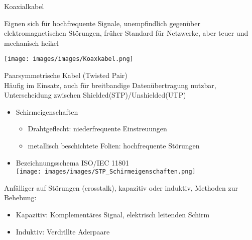     \begin{definition}{Koaxialkabel}\\
        \begin{minipage}{0.65\linewidth}
            Eignen sich für hochfrequente Signale, unempfindlich gegenüber elektromagnetischen Störungen, früher Standard für Netzwerke, aber teuer und mechanisch heikel
        \end{minipage}
        \begin{minipage}{0.3\linewidth}
            \texttt{[image: images/images/Koaxkabel.png]}
        \end{minipage}
    \end{definition}

    \begin{definition}{Paarsymmetrische Kabel (Twisted Pair)}\\
        Häufig im Einsatz, auch für breitbandige Datenübertragung nutzbar, 
        Unterscheidung zwischen Shielded(STP)/Unshielded(UTP)
        \begin{itemize}
            \item Schirmeigenschaften
            \begin{itemize}
                \item Drahtgeflecht: niederfrequente Einstreuungen
                \item metallisch beschichtete Folien: hochfrequente Störungen
            \end{itemize}
            \item Bezeichnungsschema ISO/IEC 11801\\
            \texttt{[image: images/images/STP\_Schirmeigenschaften.png]}
        \end{itemize}
        Anfälliger auf Störungen (crosstalk), kapazitiv oder induktiv, Methoden zur Behebung:
        \begin{itemize}
            \item Kapazitiv: Komplementäres Signal, elektrisch leitenden Schirm
            \item Induktiv: Verdrillte Aderpaare
        \end{itemize}
    \end{definition}

